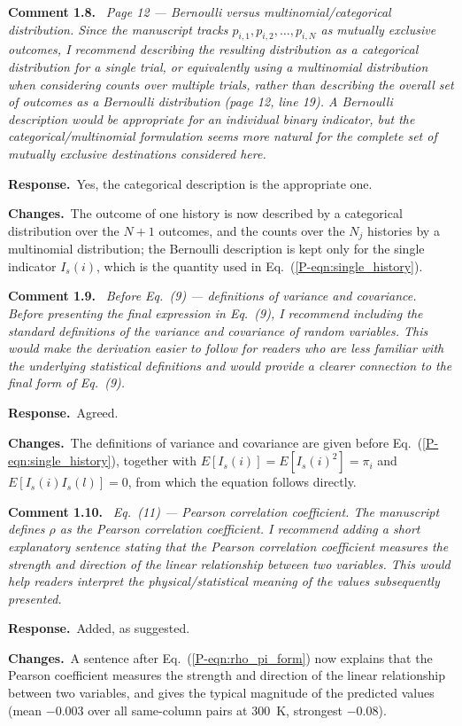\documentclass[11pt]{article}
\newenvironment{revcomment}[1]
  {\par\medskip\noindent\textbf{Comment #1.}\ \itshape}
  {\par}
\newcommand{\response}{\par\noindent\textbf{Response.}\ }
\newcommand{\changes}{\par\noindent\textbf{Changes.}\ }
\begin{document}
\begin{revcomment}{1.8}
Page 12 --- Bernoulli versus multinomial/categorical distribution. Since the manuscript
tracks $p_{i,1}, p_{i,2},\ldots,p_{i,N}$ as mutually exclusive outcomes, I recommend
describing the resulting distribution as a categorical distribution for a single trial,
or equivalently using a multinomial distribution when considering counts over multiple
trials, rather than describing the overall set of outcomes as a Bernoulli distribution
(page 12, line 19). A Bernoulli description would be appropriate for an individual binary
indicator, but the categorical/multinomial formulation seems more natural for the
complete set of mutually exclusive destinations considered here.
\end{revcomment}
\response Yes, the categorical description is the appropriate one.
\changes The outcome of one history is now described by a categorical distribution over the $N+1$ outcomes, and the counts over the $N_j$ histories by a multinomial distribution; the Bernoulli description is kept only for the single indicator $I_s(i)$, which is the quantity used in Eq.~(\ref{P-eqn:single_history}).

\begin{revcomment}{1.9}
Before Eq.~(9) --- definitions of variance and covariance. Before presenting the final
expression in Eq.~(9), I recommend including the standard definitions of the variance and
covariance of random variables. This would make the derivation easier to follow for
readers who are less familiar with the underlying statistical definitions and would
provide a clearer connection to the final form of Eq.~(9).
\end{revcomment}
\response Agreed.
\changes The definitions of variance and covariance are given before Eq.~(\ref{P-eqn:single_history}), together with $E[I_s(i)]=E[I_s(i)^2]=\pi_i$ and $E[I_s(i)I_s(l)]=0$, from which the equation follows directly.

\begin{revcomment}{1.10}
Eq.~(11) --- Pearson correlation coefficient. The manuscript defines $\rho$ as the
Pearson correlation coefficient. I recommend adding a short explanatory sentence stating
that the Pearson correlation coefficient measures the strength and direction of the
linear relationship between two variables. This would help readers interpret the
physical/statistical meaning of the values subsequently presented.
\end{revcomment}
\response Added, as suggested.
\changes A sentence after Eq.~(\ref{P-eqn:rho_pi_form}) now explains that the Pearson coefficient measures the strength and direction of the linear relationship between two variables, and gives the typical magnitude of the predicted values (mean $-0.003$ over all same-column pairs at 300~K, strongest $-0.08$).
\end{document}
